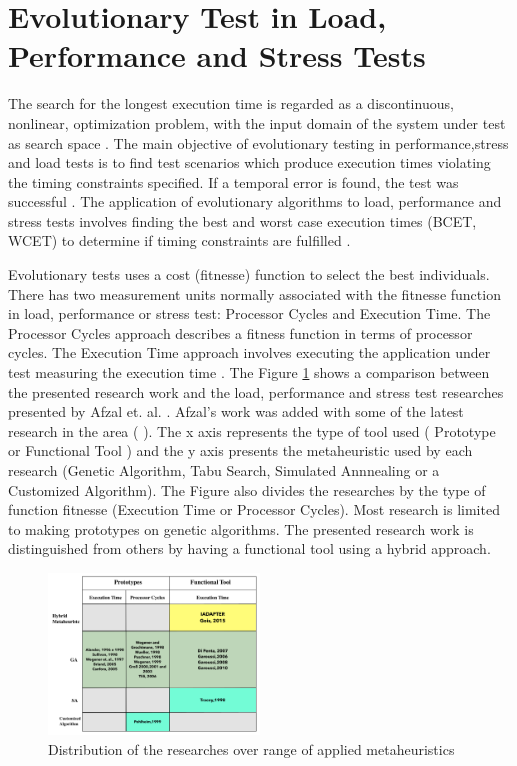 \section{Evolutionary Test in Load, Performance and Stress Tests}

The search for the longest execution time is regarded as a discontinuous, nonlinear, optimization problem, with the input domain of the system under test as search space \cite{Sullivan}. The main objective of evolutionary testing in performance,stress and load tests is to find test scenarios which produce execution times violating the timing constraints specified. If a temporal error is found, the test was successful \cite{Sullivan}. The application of evolutionary algorithms to load, performance and stress tests involves finding the best and worst case execution times (BCET, WCET) to determine if timing constraints are fulfilled \cite{Afzal2009a}. 

Evolutionary tests uses a cost (fitnesse) function to select the best individuals. There has two measurement units normally associated with the fitnesse function in load, performance or stress test: Processor Cycles and Execution Time. The Processor Cycles approach describes a fitness function in terms of processor cycles. The Execution Time approach involves executing the application under test measuring the execution time \cite{Afzal2009} \cite{tracey2000search}.
%
%
The Figure \ref{fig:comparison}  shows a comparison between the presented research work and the load, performance and stress test researches presented by Afzal et. al. \cite{Afzal2009}. Afzal's work was added with some of the latest research in the area (\cite{Garousi2006} \cite{Garousi2010}). The x axis represents the type of tool used ( Prototype or Functional Tool )  and the y axis presents the metaheuristic used by each research (Genetic Algorithm, Tabu Search, Simulated Annnealing or a Customized Algorithm). The Figure also divides the researches by the type of function fitnesse (Execution Time or Processor Cycles). Most research is limited to making prototypes on genetic algorithms. The presented research work is distinguished from others by having a functional tool using a hybrid approach. 

%
%

\begin{figure}[h]
\centering
\includegraphics[width=0.5\textwidth]{./images/comparativo1.png}
\caption{
Distribution of the researches over range of applied metaheuristics}
\label{fig:comparison}
\end{figure}

